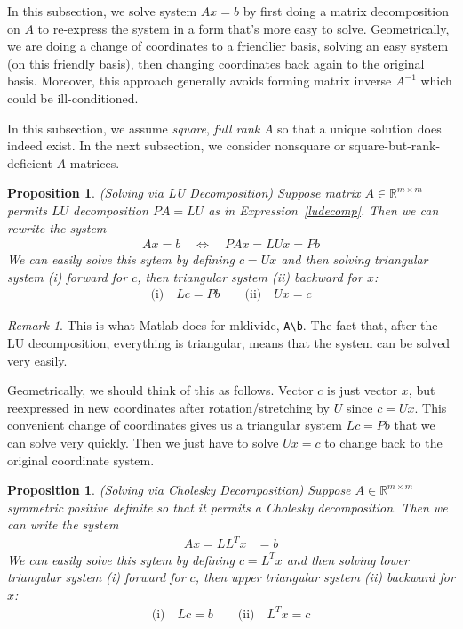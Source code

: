 \documentclass[12pt]{article}
\numberwithin{equation}{section} %
\theoremstyle{plain}
\newtheorem{prop}[thm]{Proposition}
\theoremstyle{definition}
\theoremstyle{remark}
\newtheorem*{rmk}{Remark}
\newcommand{\Rmm}{\mathbb{R}^{m\times m}}
\begin{document}
In this subsection, we solve system $Ax=b$ by first doing a matrix
decomposition on $A$ to re-express the system in a form that's more easy
to solve.
Geometrically, we are doing a change of coordinates to a friendlier
basis, solving an easy system (on this friendly basis), then
changing coordinates back again to the original basis.
Moreover, this approach generally avoids forming matrix inverse $A^{-1}$
which could be ill-conditioned.

In this subsection, we assume \emph{square}, \emph{full rank} $A$
so that a unique solution does indeed exist. In the next
subsection, we consider nonsquare or square-but-rank-deficient $A$
matrices.

\begin{prop}\emph{(Solving via LU Decomposition)}
Suppose matrix $A\in\Rmm$ permits $LU$ decomposition $PA = LU$ as in
Expression~\ref{ludecomp}.
Then we can rewrite the system
\begin{align*}
  Ax = b
  \quad\iff\quad
  PAx = LUx = Pb
\end{align*}
We can easily solve this sytem by defining $c=Ux$ and then solving
triangular system (i) forward for $c$, then triangular system (ii)
backward for $x$:
\begin{align*}
  \text{(i)}\quad Lc = Pb
  \qquad
  \text{(ii)}\quad Ux = c
\end{align*}
\end{prop}
\begin{rmk}
This is what Matlab does for mldivide, \texttt{A\textbackslash b}.
The fact that, after the LU decomposition, everything is triangular,
means that the system can be solved very easily.

Geometrically, we should think of this as follows. Vector $c$ is just
vector $x$, but reexpressed in new coordinates after rotation/stretching
by $U$ since $c=Ux$. This convenient change of coordinates gives us a
triangular system $Lc = Pb$ that we can solve very quickly. Then we just
have to solve $Ux = c$ to change back to the original coordinate system.
\end{rmk}

\begin{prop}\emph{(Solving via Cholesky Decomposition)}
Suppose $A\in\Rmm$ symmetric positive definite so that it permits a
Cholesky decomposition. Then we can write the system
\begin{align*}
  Ax = LL^Tx&=b
\end{align*}
We can easily solve this sytem by defining $c=L^Tx$ and then solving
lower triangular system (i) forward for $c$, then upper triangular
system (ii) backward for $x$:
\begin{align*}
  \text{(i)}\quad Lc = b
  \qquad
  \text{(ii)}\quad L^Tx = c
\end{align*}
\end{prop}
\end{document}
